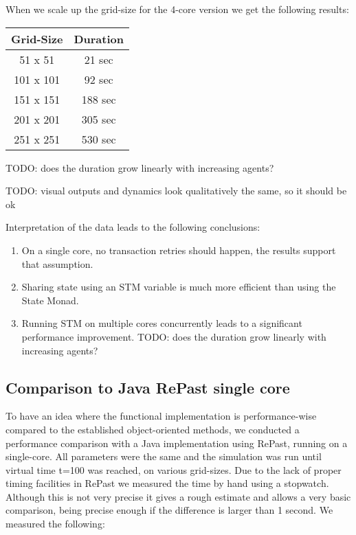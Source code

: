When we scale up the grid-size for the 4-core version we get the following results:

\begin{center}
  \begin{tabular}{ c || c }
    Grid-Size & Duration \\ \hline \hline 
    51 x 51 & 21 sec \\ \hline
    101 x 101 & 92 sec \\ \hline
    151 x 151 & 188 sec \\ \hline
    201 x 201 & 305 sec \\ \hline
    251 x 251 & 530 sec \\ \hline
  \end{tabular}
\end{center}

TODO: does the duration grow linearly with increasing agents?

TODO: visual outputs and dynamics look qualitatively the same, so it should be ok

Interpretation of the data leads to the following conclusions:
\begin{enumerate}
	\item On a single core, no transaction retries should happen, the results support that assumption.
	\item Sharing state using an STM variable is much more efficient than using the State Monad.
	\item Running STM on multiple cores concurrently leads to a significant performance improvement. TODO: does the duration grow linearly with increasing agents?
\end{enumerate}

\subsection{Comparison to Java RePast single core}
To have an idea where the functional implementation is performance-wise compared to the established object-oriented methods, we conducted a performance comparison with a Java implementation using RePast, running on a single-core. All parameters were the same and the simulation was run until virtual time t=100 was reached, on various grid-sizes. Due to the lack of proper timing facilities in RePast we measured the time by hand using a stopwatch. Although this is not very precise it gives a rough estimate and allows a very basic comparison, being precise enough if the difference is larger than 1 second. We measured the following:

